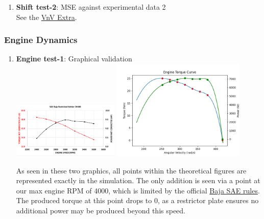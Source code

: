 \documentclass[12pt, titlepage]{article}
\begin{document}
\begin{enumerate}
\item{\textbf{Shift test-2}: MSE against experimental data 2}\\

See the \href{https://github.com/gr812b/CVT-Simulator/blob/develop/docs/VnVExtra/VnVExtra.pdf}{VnV Extra}.

\end{enumerate}

\subsubsection{Engine Dynamics}
\begin{enumerate}
\item{\textbf{Engine test-1}: Graphical validation}\\

\includegraphics[width=0.4\textwidth]{theoretical-figures/engine.png}
\includegraphics[width=0.5\textwidth]{simulation-figures/engine_specs.png}

As seen in these two graphics, all points within the theoretical figures are represented exactly in the simulation. The only addition is seen via a point at our max engine RPM of 4000, which is limited by the official \href{https://www.bajasae.net/cdsweb/gen/DocumentResources.aspx}{Baja SAE rules}. The produced torque at this point drops to 0, as a restrictor plate ensures no additional power may be produced beyond this speed.

\end{enumerate}
\end{document}
